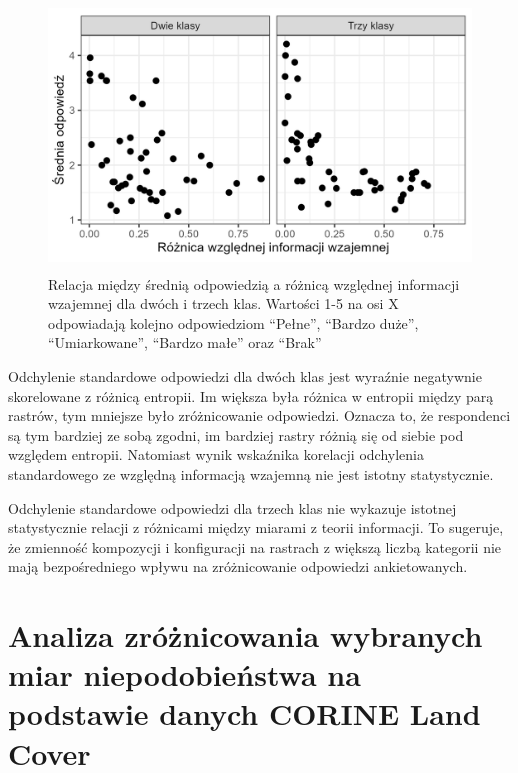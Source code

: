 \documentclass{amuthesis}
\begin{document}
\begin{figure}[t]

{\centering \includegraphics[width=4.6875in,height=2.8125in]{figures/answer_mean_vs_relmutinf_diff.png}

}

\caption{\label{fig-answer_mean_vs_relmutinf_diff}Relacja między średnią
odpowiedzią a różnicą względnej informacji wzajemnej dla dwóch i trzech
klas. Wartości 1-5 na osi X odpowiadają kolejno odpowiedziom ``Pełne'',
``Bardzo duże'', ``Umiarkowane'', ``Bardzo małe'' oraz ``Brak''}

\end{figure}

Odchylenie standardowe odpowiedzi dla dwóch klas jest wyraźnie
negatywnie skorelowane z różnicą entropii. Im większa była różnica w
entropii między parą rastrów, tym mniejsze było zróżnicowanie
odpowiedzi. Oznacza to, że respondenci są tym bardziej ze sobą zgodni,
im bardziej rastry różnią się od siebie pod względem entropii. Natomiast
wynik wskaźnika korelacji odchylenia standardowego ze względną
informacją wzajemną nie jest istotny statystycznie.

Odchylenie standardowe odpowiedzi dla trzech klas nie wykazuje istotnej
statystycznie relacji z różnicami między miarami z teorii informacji. To
sugeruje, że zmienność kompozycji i konfiguracji na rastrach z większą
liczbą kategorii nie mają bezpośredniego wpływu na zróżnicowanie
odpowiedzi ankietowanych.


\hypertarget{analiza-zruxf3ux17cnicowania-wybranych-miar-niepodobieux144stwa-na-podstawie-danych-corine-land-cover}{%
\chapter{Analiza zróżnicowania wybranych miar niepodobieństwa na
podstawie danych CORINE Land
Cover}\label{analiza-zruxf3ux17cnicowania-wybranych-miar-niepodobieux144stwa-na-podstawie-danych-corine-land-cover}}
\end{document}
